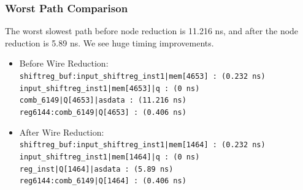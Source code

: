 \documentclass[letterpaper, 12pt]{article} %
\begin{document}
\subsubsection{Worst Path Comparison}
The worst slowest path before node reduction is 11.216 ns, and after the node reduction is 5.89 ns. We see huge timing improvements.
\begin{itemize}
\item Before Wire Reduction: \\
\texttt{shiftreg\_buf:input\_shiftreg\_inst1|mem[4653] : (0.232 ns)}\\
\texttt{input\_shiftreg\_inst1|mem[4653]|q : (0 ns)}\\
\texttt{comb\_6149|Q[4653]|asdata : (11.216 ns)}\\
\texttt{reg6144:comb\_6149|Q[4653] : (0.406 ns)}\\

\item After Wire Reduction: \\
\texttt{shiftreg\_buf:input\_shiftreg\_inst1|mem[1464] : (0.232 ns)}\\
\texttt{input\_shiftreg\_inst1|mem[1464]|q : (0 ns)}\\
\texttt{reg\_inst|Q[1464]|asdata : (5.89 ns)}\\
\texttt{reg6144:comb\_6149|Q[1464] : (0.406 ns)}\\

\end{itemize}
\end{document}
